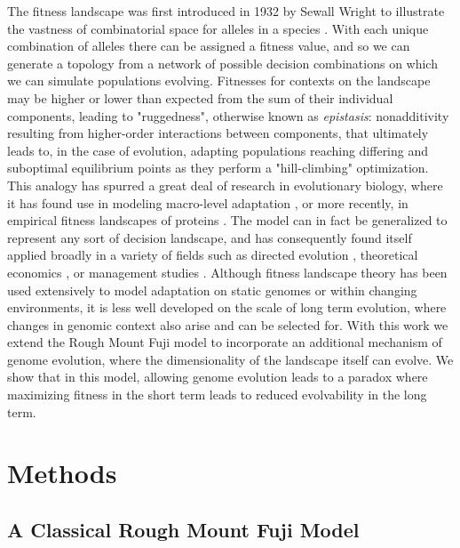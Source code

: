 \documentclass[paper=a4, fontsize=11pt,twoside]{scrartcl}       %
\begin{document}
The fitness landscape was first introduced in 1932 by Sewall Wright to illustrate the vastness of combinatorial space for alleles in a species \cite{wrightRolesMutationInbreeding}. With each unique combination of alleles there can be assigned a fitness value, and so we can generate a topology from a network of possible decision combinations on which we can simulate populations evolving. Fitnesses for contexts on the landscape may be higher or lower than expected from the sum of their individual components, leading to "ruggedness", otherwise known as \textit{epistasis}: nonadditivity resulting from higher-order interactions between components, that ultimately leads to, in the case of evolution, adapting populations reaching differing and suboptimal equilibrium points as they perform a "hill-climbing" optimization. This analogy has spurred a great deal of research in evolutionary biology, where it has found use in modeling macro-level adaptation \cite{venkataramMutualismenhancingMutationsDominate2023}\cite{frankeEvolutionaryAccessibilityMutational2011}, or more recently, in empirical fitness landscapes of proteins \cite{papkouRuggedEasilyNavigable2023}. The model can in fact be generalized to represent any sort of decision landscape, and has consequently found itself applied broadly in a variety of fields such as directed evolution \cite{alpayEffectsSelectionStringency2024}, theoretical economics \cite{khraishaComplexEconomicProblems2020}, or management studies \cite{siggelkowFirmsSystemsInterdependent2011}. Although fitness landscape theory has been used extensively to model adaptation on static genomes or within changing environments, it is less well developed on the scale of long term evolution, where changes in genomic context also arise and can be selected for. With this work we extend the Rough Mount Fuji model to incorporate an additional mechanism of genome evolution, where the dimensionality of the landscape itself can evolve. We show that in this model, allowing genome evolution leads to a paradox where maximizing fitness in the short term leads to reduced evolvability in the long term. 

\section*{Methods}

\subsection*{A Classical Rough Mount Fuji Model}
\end{document}
